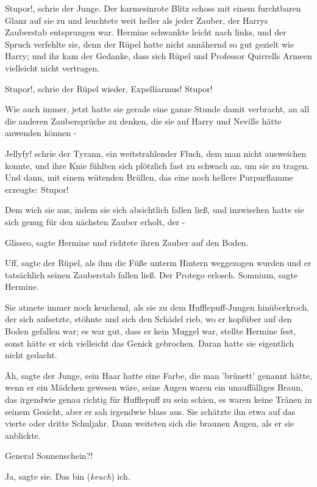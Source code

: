 \glqq Stupor!\grqq{}, schrie der Junge. Der karmesinrote Blitz schoss mit einem
furchtbaren Glanz auf sie zu und leuchtete weit heller als jeder Zauber, der
Harrys Zauberstab entsprungen war. Hermine schwankte leicht nach links, und der
Spruch verfehlte sie, denn der Rüpel hatte nicht annähernd so gut gezielt wie
Harry; und ihr kam der Gedanke, dass sich Rüpel und Professor Quirrells Armeen
vielleicht nicht vertragen.

\glqq Stupor!\grqq{}, schrie der Rüpel wieder. \glqq Expelliarmus!
Stupor!\grqq{}

Wie auch immer, jetzt hatte sie gerade eine ganze Stunde damit verbracht, an all
die anderen Zaubersprüche zu denken, die sie auf Harry und Neville hätte
anwenden können -

\glqq Jellyfy!\grqq{} schrie der Tyrann, ein weitstrahlender Fluch, dem man
nicht ausweichen konnte, und ihre Knie fühlten sich plötzlich fast zu schwach
an, um sie zu tragen. Und dann, mit einem wütenden Brüllen, das eine noch
hellere Purpurflamme erzeugte: \glqq Stupor!\grqq{}

Dem wich sie aus, indem sie sich absichtlich fallen ließ, und inzwischen hatte
sie sich genug für den nächsten Zauber erholt, der -

\glqq Glisseo\grqq{}, sagte Hermine und richtete ihren Zauber auf den Boden.

\glqq Uff\grqq{}, sagte der Rüpel, als ihm die Füße unterm Hintern weggezogen
wurden und er tatsächlich seinen Zauberstab fallen ließ. Der Protego erlosch.
\glqq Somnium\grqq{}, sagte Hermine.

Sie atmete immer noch keuchend, als sie zu dem Hufflepuff-Jungen hinüberkroch,
der sich aufsetzte, stöhnte und sich den Schädel rieb, wo er kopfüber auf den
Boden gefallen war; es war gut, dass er kein Muggel war, stellte Hermine fest,
sonst hätte er sich vielleicht das Genick gebrochen. Daran hatte sie eigentlich
nicht gedacht.

\glqq Äh\grqq{}, sagte der Junge, sein Haar hatte eine Farbe, die man 'brünett'
genannt hätte, wenn er ein Mädchen gewesen wäre, seine Augen waren ein
unauffälliges Braun, das irgendwie genau richtig für Hufflepuff zu sein schien,
es waren keine Tränen in seinem Gesicht, aber er sah irgendwie blass aus. Sie
schätzte ihn etwa auf das vierte oder dritte Schuljahr. Dann weiteten sich die
braunen Augen, als er sie anblickte.

\glqq General Sonnenschein?!\grqq{}

\glqq Ja\grqq{}, sagte sie. \glqq Das bin (\emph{keuch}) ich.\grqq{}

